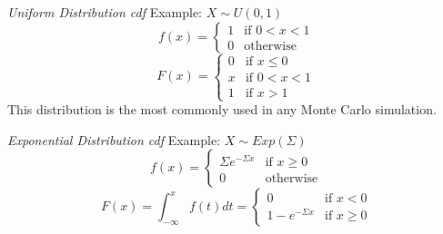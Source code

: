 \emph{Uniform Distribution cdf}
  Example: $X \sim U(0,1)$
     \begin{displaymath}
        f(x) = \left\{ \begin{array}{ll}
                         1 & \textrm{if $0 < x < 1$}\\                       
                         0 & \textrm{otherwise}
                       \end{array} \right.
     \end{displaymath}
     \begin{displaymath}
        F(x) = \left\{ \begin{array}{ll}
                         0 & \textrm{if $x \le 0$}\\                       
                         x & \textrm{if $0 < x < 1$}\\
                         1 & \textrm{if $x > 1$}
                       \end{array} \right.
     \end{displaymath}
  This distribution is the most commonly used in any Monte Carlo simulation.


\emph{Exponential Distribution cdf}
  Example: $X \sim Exp(\Sigma)$
     \begin{displaymath}
        f(x) = \left\{ \begin{array}{ll}
                         \Sigma e^{-\Sigma x} & \textrm{if $x \ge 0$}\\                       
                         0 & \textrm{otherwise}
                       \end{array} \right.
     \end{displaymath}
     \begin{displaymath}
        F(x) = \int_{-\infty}^{x}f(t)dt = \left\{ \begin{array}{ll}
                         0 & \textrm{if $x < 0$}\\                       
                         1-e^{-\Sigma x} & \textrm{if $x \ge 0$}
                       \end{array} \right.
     \end{displaymath}


